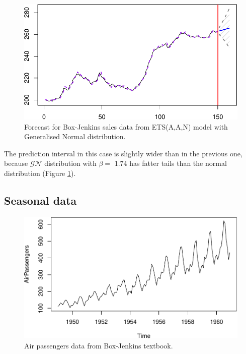 \documentclass[]{book}
\theoremstyle{definition}
\theoremstyle{definition}
\theoremstyle{definition}
\theoremstyle{definition}
\theoremstyle{remark}
\begin{document}
\begin{figure}
\centering
\includegraphics{Svetunkov--2022----ADAM_files/figure-latex/BJsalesAANForecastGN-1.pdf}
\caption{\label{fig:BJsalesAANForecastGN}Forecast for Box-Jenkins sales data from ETS(A,A,N) model with Generalised Normal distribution.}
\end{figure}

The prediction interval in this case is slightly wider than in the previous one, because \(\mathcal{GN}\) distribution with \(\beta=\) 1.74 has fatter tails than the normal distribution (Figure \ref{fig:BJsalesAANForecastGN}).

\hypertarget{ADAMETSPureAdditiveExamplesETSAAA}{%
\subsection{Seasonal data}\label{ADAMETSPureAdditiveExamplesETSAAA}}

\begin{figure}
\centering
\includegraphics{Svetunkov--2022----ADAM_files/figure-latex/AirPassengersPlot-1.pdf}
\caption{\label{fig:AirPassengersPlot}Air passengers data from Box-Jenkins textbook.}
\end{figure}
\end{document}

